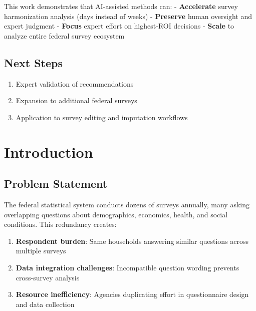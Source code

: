 \documentclass[
  letterpaper,
]{report}
\providecommand{\tightlist}{%
  \setlength{\itemsep}{0pt}\setlength{\parskip}{0pt}}
\begin{document}

This work demonstrates that AI-assisted methods can: -
\textbf{Accelerate} survey harmonization analysis (days instead of
weeks) - \textbf{Preserve} human oversight and expert judgment -
\textbf{Focus} expert effort on highest-ROI decisions - \textbf{Scale}
to analyze entire federal survey ecosystem

\section*{Next Steps}\label{next-steps}


\begin{enumerate}
\def\labelenumi{\arabic{enumi}.}
\tightlist
\item
  Expert validation of recommendations
\item
  Expansion to additional federal surveys
\item
  Application to survey editing and imputation workflows
\end{enumerate}


\chapter{Introduction}\label{introduction}

\section{Problem Statement}\label{problem-statement}

The federal statistical system conducts dozens of surveys annually, many
asking overlapping questions about demographics, economics, health, and
social conditions. This redundancy creates:

\begin{enumerate}
\def\labelenumi{\arabic{enumi}.}
\tightlist
\item
  \textbf{Respondent burden}: Same households answering similar
  questions across multiple surveys
\item
  \textbf{Data integration challenges}: Incompatible question wording
  prevents cross-survey analysis
\item
  \textbf{Resource inefficiency}: Agencies duplicating effort in
  questionnaire design and data collection
\end{enumerate}
\end{document}
